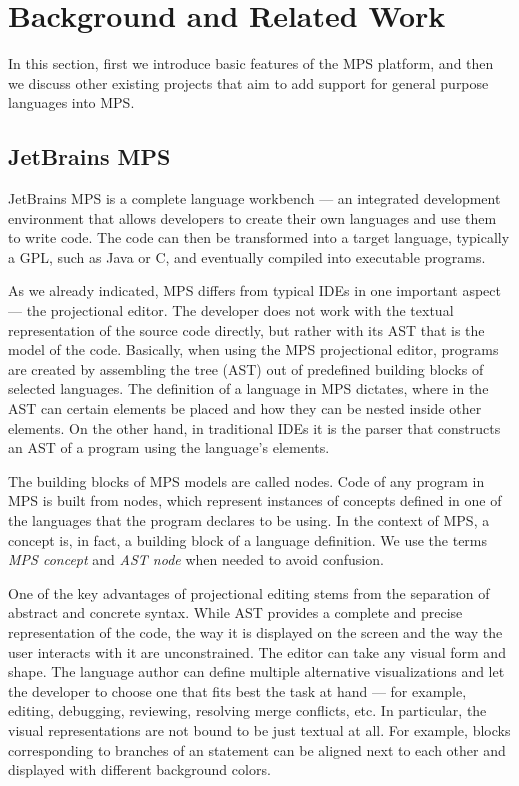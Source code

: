 \section{Background and Related Work}
\label{sect:BACKGRELWORK}

In this section, first we introduce basic features of the MPS platform, and then we discuss other existing projects that aim to add support for general purpose languages into MPS.

\subsection{JetBrains MPS}
\label{sect:MPS}

JetBrains MPS is a complete language workbench --- an integrated development environment that allows developers to create their own languages and use them to write code.
The code can then be transformed into a target language, typically a GPL, such as Java or C, and eventually compiled into executable programs.

As we already indicated, MPS differs from typical IDEs in one important aspect --- the projectional editor.
The developer does not work with the textual representation of the source code directly, but rather with its AST that is the model of the code.
Basically, when using the MPS projectional editor, programs are created by assembling the tree (AST) out of predefined building blocks of selected languages.
The definition of a language in MPS dictates, where in the AST can certain elements be placed and how they can be nested inside other elements.
On the other hand, in traditional IDEs it is the parser that constructs an AST of a program using the language's elements.

The building blocks of MPS models are called nodes.
Code of any program in MPS is built from nodes, which represent instances of concepts defined in one of the languages that the program declares to be using.
In the context of MPS, a concept is, in fact, a building block of a language definition.
We use the terms \emph{MPS concept} and \emph{AST node} when needed to avoid confusion.

One of the key advantages of projectional editing stems from the separation of abstract and concrete syntax.
While AST provides a complete and precise representation of the code, the way it is displayed on the screen and the way the user interacts with it are unconstrained.
The editor can take any visual form and shape.
The language author can define multiple alternative visualizations and let the developer to choose one that fits best the task at hand --- for example, editing, debugging, reviewing, resolving merge conflicts, etc.
In particular, the visual representations are not bound to be just textual at all.
For example, blocks corresponding to branches of an  statement can be aligned next to each other and displayed with different background colors.

